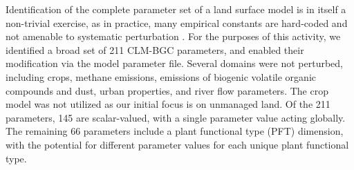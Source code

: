 \documentclass[draft]{agujournal2019}
\begin{document}
Identification of the complete parameter set of a land surface model is in itself a non-trivial exercise, as in practice, many empirical constants are hard-coded and not amenable to systematic perturbation \cite{mendoza2015,cuntz2016}. For the purposes of this activity, we identified a broad set of 211 CLM-BGC parameters, and enabled their modification via the model parameter file. Several domains were not perturbed, including crops, methane emissions, emissions of biogenic volatile organic compounds and dust, urban properties, and river flow parameters. The crop model was not utilized as our initial focus is on unmanaged land. Of the 211 parameters, 145 are scalar-valued, with a single parameter value acting globally. The remaining 66 parameters include a plant functional type (PFT) dimension, with the potential for different parameter values for each unique plant functional type.  
\end{document}
